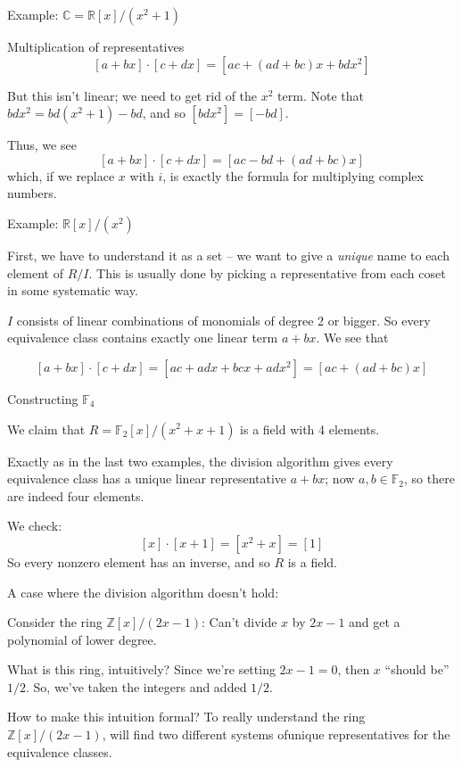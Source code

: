 \documentclass{beamer}
\newcommand{\Z}{\mathbb{Z}}
\newcommand{\R}{\mathbb{R}}
\begin{document}
\begin{frame}{Example: $\mathbb{C}=\R[x]/(x^2+1)$}

\begin{block}{Multiplication of representatives}
$$[a+bx]\cdot [c+dx]=[ac+(ad+bc)x+bdx^2]$$

But this isn't linear;  we need to get rid of the $x^2$ term.  Note that $bdx^2=bd(x^2+1)-bd$, and so $[bdx^2]=[-bd]$.

Thus, we see
$$[a+bx]\cdot [c+dx]=[ac-bd+(ad+bc)x]$$
which, if we replace $x$ with $i$, is exactly the formula for multiplying complex numbers.
\end{block}


\end{frame}


\begin{frame}{Example: $\R[x]/(x^2)$}

First, we have to understand it as a set -- we want to give a \emph{unique} name to each element of $R/I$.  This is usually done by picking a representative from each coset in some systematic way.

$I$ consists of linear combinations of monomials of degree 2 or bigger.  So every equivalence class contains exactly one linear term $a+bx$.  We see that 

$$[a+bx]\cdot [c+dx]=[ac+adx+bcx+adx^2]=[ac+(ad+bc)x]$$


\end{frame}




\begin{frame}{Constructing $\mathbb{F}_4$}

We claim that $R=\mathbb{F}_2[x]/(x^2+x+1)$ is a field with 4 elements.  

Exactly as in the last two examples, the division algorithm gives every equivalence class has a unique linear representative $a+bx$; now $a,b\in\mathbb{F}_2$, so there are indeed four elements.

We check:
$$[x]\cdot [x+1]=[x^2+x]=[1]$$
So every nonzero element has an inverse, and so $R$ is a field.
\end{frame}

\begin{frame}{A case where the division algorithm doesn't hold:}
\begin{block}{Consider the ring $\Z[x]/(2x-1)$:}
Can't divide $x$ by $2x-1$ and get a polynomial of lower degree.  
\end{block}

\begin{block}{What is this ring, intuitively?}
  Since we're setting $2x-1=0$, then $x$ ``should be'' $1/2$.  So, we've taken the integers and added $1/2$.
  \end{block}

\begin{block}{How to make this intuition formal?}
To really understand the ring $\Z[x]/(2x-1)$, will find two different systems ofunique representatives for the equivalence classes.
\end{block}
  
  \end{frame}
\end{document}
